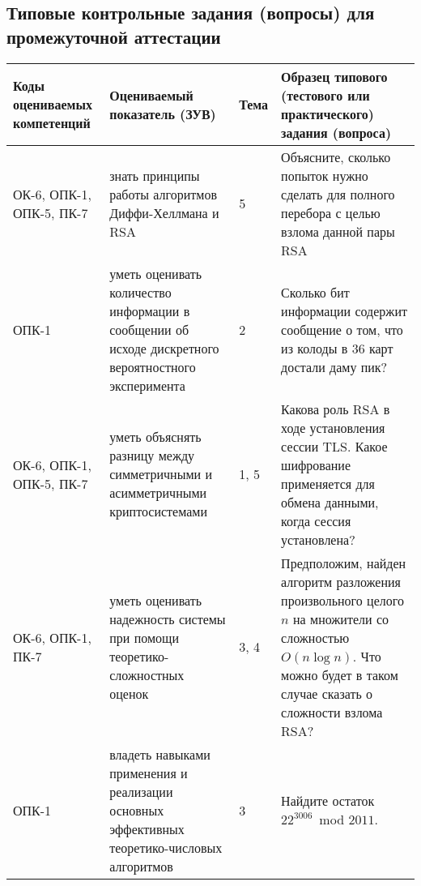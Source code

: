 \documentclass[a4paper,12pt]{article}
\begin{document}
\subsection{Типовые контрольные задания (вопросы) для промежуточной аттестации}

\begin{longtable}{|p{15mm}|p{42mm}|p{17mm}|p{70mm}|}
\hline
\centering\small Коды оцениваемых компетенций  & \centering Оцениваемый показатель (ЗУВ) 
& \centering Тема  & \centering\arraybackslash Образец типового (тестового или практического) задания (вопроса)
\\
\hline

ОК-6, ОПК-1, ОПК-5, ПК-7 & 
знать принципы работы алгоритмов Диффи-Хеллмана и RSA & 
5 & 
Объясните, сколько попыток нужно сделать для полного перебора с целью взлома данной пары RSA 
\\
\hline
ОПК-1 & 
уметь оценивать количество информации в сообщении об исходе дискретного вероятностного эксперимента & 
2 & 
Сколько бит информации содержит сообщение о том, что из колоды в 36 карт достали даму пик? 
\\
\hline
ОК-6, ОПК-1, ОПК-5, ПК-7 & 
уметь объяснять разницу между симметричными и асимметричными криптосистемами & 
1, 5 & 
Какова роль RSA в ходе установления сессии TLS. Какое шифрование применяется для обмена данными, когда сессия установлена? 
\\
\hline
ОК-6, ОПК-1, ПК-7 & 
уметь оценивать надежность системы при помощи теоретико-сложностных оценок & 
3, 4 & 
Предположим, найден алгоритм разложения произвольного целого $n$ на множители со сложностью $O(n\log n)$. Что можно будет в таком случае сказать о сложности взлома RSA? 
\\
\hline
ОПК-1 & 
владеть навыками применения и реализации основных эффективных теоретико-числовых алгоритмов & 
3 & 
Найдите остаток $22^{3006}$ \,mod $2011$. 
\\
\hline
\end{longtable}
\end{document}
